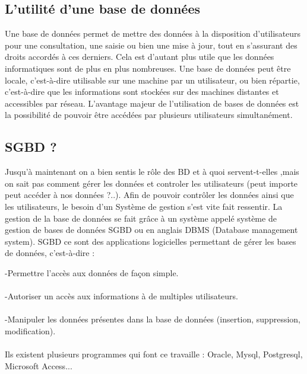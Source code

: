 \documentclass[11pt,twoside,openany,x11names,svgnames]{memoir}
\begin{document}
\subsection{L'utilité d'une base de données}

\normalsize Une base de données permet de mettre des données à la disposition d'utilisateurs 
pour une consultation, une saisie ou bien une mise à jour, tout en s'assurant des droits accordés 
à ces derniers. Cela est d'autant plus utile que les données informatiques sont de plus 
en plus nombreuses. 
Une base de données peut être locale, c'est-à-dire utilisable sur une machine 
par un utilisateur, ou bien répartie, c'est-à-dire que les informations sont stockées 
sur des machines distantes et accessibles par réseau. 
L'avantage majeur de l'utilisation de bases de données est la possibilité de pouvoir 
être accédées par plusieurs utilisateurs simultanément. 

				\subsection{SGBD ?}
				\normalsize Jusqu'à maintenant on a bien sentis le rôle des BD et à quoi servent-t-elles ,mais on sait pas comment gérer les données et controler les utilisateurs (peut importe peut accéder à nos données ?..).
				Afin de pouvoir contrôler les données ainsi que les utilisateurs, le besoin d'un 
Système de gestion s'est vite fait ressentir. 
La gestion de la base de données se fait grâce à un système appelé système de gestion de bases de données SGBD ou en anglais DBMS (Database management system).
SGBD ce sont des applications logicielles permettant de gérer les
bases de données, c'est-à-dire :

-Permettre l'accès aux données de façon simple.\paragraph{}
-Autoriser un accès aux informations à de multiples utilisateurs.\paragraph{}
-Manipuler les données présentes dans la base de données (insertion, suppression, modification).\paragraph{}
\normalsize Ils existent plusieurs programmes qui font ce travaille : Oracle, Mysql, Postgresql, Microsoft Access...
				
\end{document}
